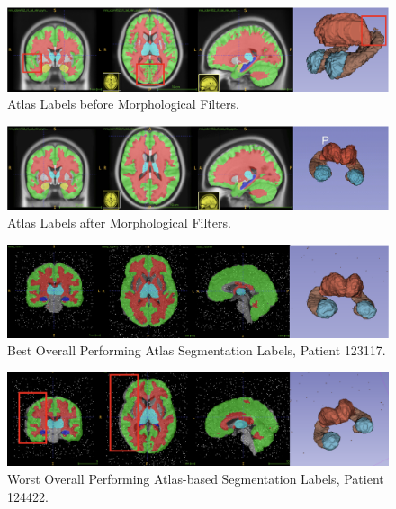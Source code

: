 \begin{figure} [H]
	\centering
	\includegraphics[width=\textwidth]{"figures/atlas before median filter"}
	\caption{Atlas Labels before Morphological Filters.}
	\label{fig:atlas-before-median-filter}
\end{figure}

\begin{figure} [H]
	\centering
	\includegraphics[width=\textwidth]{"figures/atlas after filter"}
	\caption{Atlas Labels after Morphological Filters.}
	\label{fig:atlas-after-median-filter}
\end{figure}

\begin{figure} [H]
	\centering
	\includegraphics[width=\textwidth]{"figures/atlas_best"}
	\caption{Best Overall Performing Atlas Segmentation Labels, Patient 123117.}
	\label{fig:atlas-best}
\end{figure}

\begin{figure} [H]
	\centering
	\includegraphics[width=\textwidth]{"figures/atlas_worst"}
	\caption{Worst Overall Performing Atlas-based Segmentation Labels, Patient 124422.}
	\label{fig:atlas-worst}
\end{figure}

